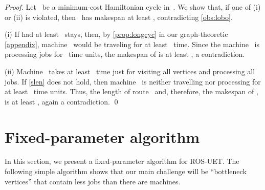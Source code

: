 \documentclass[natbib,sort,smallextended,envcountsame,envcountsect,numbook]{svjour3}
\newcommand{\ROSUPT}{\textsc{ROS-UET}}
\begin{document}
\begin{proof}
  Let ~be a minimum-cost Hamiltonian cycle in~.
  We show that, if one of (i) or (ii) is violated,
  then ~has makespan at least ,
  contradicting \cref{obs:lobo}.

  (i)
  If  had at least ~stays,
  then,
  by \cref{prop:longcyc} in our graph-theoretic \cref{appendix},
  machine~ would be traveling
  for at least ~time.
  Since the machine~ is processing jobs
  for ~time units,
  the makespan of  is at least ,
  a contradiction.
  
  (ii)
  Machine~ takes at least ~time just
  for visiting all vertices and processing all jobs.
  If \eqref{slen} does not hold,
  then machine~ is neither travelling nor processing
  for at least ~time units.
  Thus, the length of route~ and,
  therefore,
  the makespan of ,
  is at least , again a contradiction.
  \qed
\end{proof}

\section{Fixed-parameter algorithm}\label{sec:fpt}
\noindent 
In this section, we present a fixed-parameter algorithm for \ROSUPT{}.
The following simple algorithm shows
that our main challenge will be ``bottleneck vertices'' that
contain less jobs than there are machines.
\end{document}
